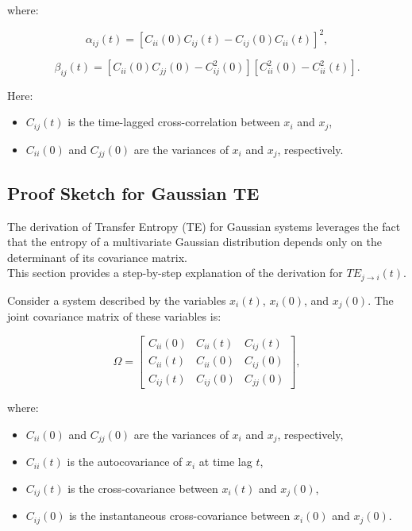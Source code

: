 \documentclass[English, Lau, oneside]{sapthesis}
\begin{document}
where:

\begin{equation}
\alpha_{ij}(t) = \left[C_{ii}(0)C_{ij}(t) - C_{ij}(0)C_{ii}(t)\right]^2,\label{alpha}
\end{equation}

\begin{equation}
\beta_{ij}(t) = \left[C_{ii}(0)C_{jj}(0) - C_{ij}^2(0)\right]\left[C_{ii}^2(0) - C_{ii}^2(t)\right].\label{beta}
\end{equation}

Here:
\begin{itemize}
    \item \(C_{ij}(t)\) is the time-lagged cross-correlation between \(x_i\) and \(x_j\),
    \item \(C_{ii}(0)\) and \(C_{jj}(0)\) are the variances of \(x_i\) and \(x_j\), respectively.
\end{itemize}
\subsection{Proof Sketch for Gaussian TE}

The derivation of Transfer Entropy (TE) for Gaussian systems leverages the fact that the entropy of a multivariate Gaussian distribution depends only on the determinant of its covariance matrix.\\
This section provides a step-by-step explanation of the derivation for \( TE_{j \to i}(t) \).\cite{ref13}



Consider a system described by the variables \(x_i(t)\), \(x_i(0)\), and \(x_j(0)\). The joint covariance matrix of these variables is:

\[
\Omega = \begin{bmatrix}
C_{ii}(0) & C_{ii}(t) & C_{ij}(t) \\
C_{ii}(t) & C_{ii}(0) & C_{ij}(0) \\
C_{ij}(t) & C_{ij}(0) & C_{jj}(0)
\end{bmatrix},
\]

where:
\begin{itemize}
    \item \(C_{ii}(0)\) and \(C_{jj}(0)\) are the variances of \(x_i\) and \(x_j\), respectively,
    \item \(C_{ii}(t)\) is the autocovariance of \(x_i\) at time lag \(t\),
    \item \(C_{ij}(t)\) is the cross-covariance between \(x_i(t)\) and \(x_j(0)\),
    \item \(C_{ij}(0)\) is the instantaneous cross-covariance between \(x_i(0)\) and \(x_j(0)\).
\end{itemize}
\end{document}
